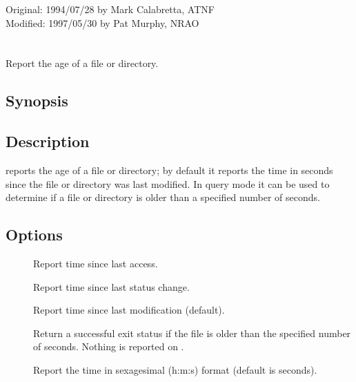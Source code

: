 Original: 1994/07/28 by Mark Calabretta, ATNF\\
Modified: 1997/05/30 by Pat Murphy, NRAO


\newpage
\section{}
\label{tract}

Report the age of a file or directory.

\subsection*{Synopsis}

\begin{synopsis}
\end{synopsis}

\subsection*{Description}

 reports the age of a file or directory; by default it reports the
time in seconds since the file or directory was last modified.  In query mode
it can be used to determine if a file or directory is older than a specified
number of seconds.

\subsection*{Options}

\begin{description}
\item[]
   Report time since last access.

\item[]
   Report time since last status change.

\item[]
   Report time since last modification (default).

\item[]
   Return a successful exit status if the file is older than the specified
   number of seconds.  Nothing is reported on .

\item[]
   Report the time in sexagesimal (h:m:s) format (default is seconds).
\end{description}

